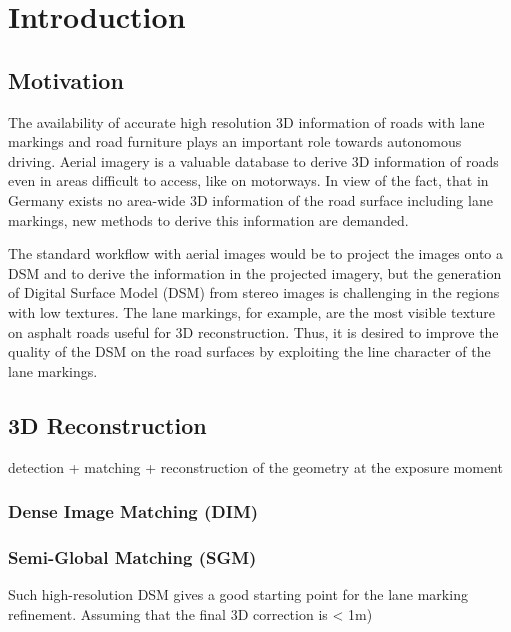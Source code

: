 
\chapter{Introduction}

\section{Motivation}
The availability of accurate high resolution 3D information of roads with lane markings and road furniture plays an important role towards autonomous driving. Aerial imagery is a valuable database to derive 3D information of roads even in areas difficult to access, like on motorways. In view of the fact, that in Germany exists no area-wide 3D information of the road surface including lane markings, new methods to derive this information are demanded.

The standard workflow with aerial images would be to project the images onto a DSM and to derive the information in the projected imagery, but the generation of Digital Surface Model (DSM) from stereo images is challenging in the regions with low textures. The lane markings, for example, are the most visible texture on asphalt roads useful for 3D reconstruction. Thus, it is desired to improve the quality of the DSM on the road surfaces by exploiting the line character of the lane markings. 





\section{3D Reconstruction}
detection + matching + reconstruction of the geometry at the exposure moment

\subsection{Dense Image Matching (DIM)}




\subsection{Semi-Global Matching (SGM)}

Such high-resolution DSM gives a good starting point for the lane marking refinement. Assuming that the final 3D correction is < 1m)


